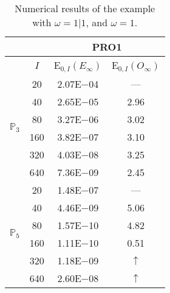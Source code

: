 \begin{table}[H]
\caption{Numerical results of the example with $\omega=1|1$, and $\omega=1$.}
\setlength{\tabcolsep}{5pt}
\centering
\begin{tabular}{@{}l c c c@{}}
\toprule
 &  & \multicolumn{2}{c}{PRO1}\\
\midrule
 & $I$ & E$_{0,I}(E_{\infty})$ & E$_{0,I}(O_{\infty})$\\
\midrule
\multirow{6}{*}{$\mathbb{P}_{3}$}
 & 20 & 2.07E$-$04 & ---\\
 & 40 & 2.65E$-$05 & 2.96\\
 & 80 & 3.27E$-$06 & 3.02\\
 & 160 & 3.82E$-$07 & 3.10\\
 & 320 & 4.03E$-$08 & 3.25\\
 & 640 & 7.36E$-$09 & 2.45\\
\midrule
\multirow{6}{*}{$\mathbb{P}_{5}$}
 & 20 & 1.48E$-$07 & ---\\
 & 40 & 4.46E$-$09 & 5.06\\
 & 80 & 1.57E$-$10 & 4.82\\
 & 160 & 1.11E$-$10 & 0.51\\
 & 320 & 1.18E$-$09 & $\uparrow$\\
 & 640 & 2.60E$-$08 & $\uparrow$\\
\bottomrule
\end{tabular}
\label{Table:PRO:test_01_01_test40_pro1}
\end{table}
